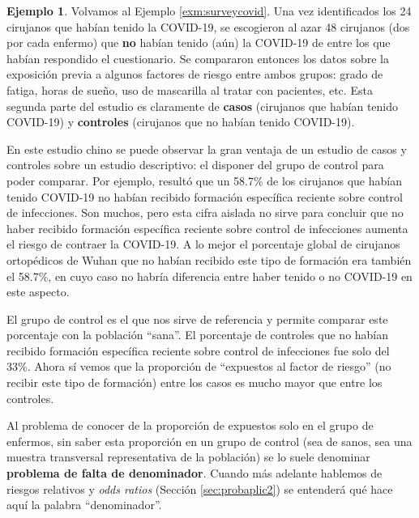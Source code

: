 \documentclass[
]{book}
\theoremstyle{definition}
\theoremstyle{definition}
\newtheorem{example}{Ejemplo}[chapter]
\theoremstyle{definition}
\theoremstyle{definition}
\theoremstyle{remark}
\begin{document}
\begin{example}
\protect\hypertarget{exm:surveycovid2}{}\label{exm:surveycovid2}Volvamos al Ejemplo \ref{exm:surveycovid}. Una vez identificados los 24 cirujanos que habían tenido la COVID-19, se escogieron al azar 48 cirujanos (dos por cada enfermo) que \textbf{no} habían tenido (aún) la COVID-19 de entre los que habían respondido el cuestionario. Se compararon entonces los datos sobre la exposición previa a algunos factores de riesgo entre ambos grupos: grado de fatiga, horas de sueño, uso de mascarilla al tratar con pacientes, etc. Esta segunda parte del estudio es claramente de \textbf{casos} (cirujanos que habían tenido COVID-19) y \textbf{controles} (cirujanos que no habían tenido COVID-19).
\end{example}

En este estudio chino se puede observar la gran ventaja de un estudio de casos y controles sobre un estudio descriptivo: el disponer del grupo de control para poder comparar. Por ejemplo, resultó que un 58.7\% de los cirujanos que habían tenido COVID-19 no habían recibido formación específica reciente sobre control de infecciones. Son muchos, pero esta cifra aislada no sirve para concluir que no haber recibido formación específica reciente sobre control de infecciones aumenta el riesgo de contraer la COVID-19. A lo mejor el porcentaje global de cirujanos ortopédicos de Wuhan que no habían recibido este tipo de formación era también el 58.7\%, en cuyo caso no habría diferencia entre haber tenido o no COVID-19 en este aspecto.

El grupo de control es el que nos sirve de referencia y permite comparar este porcentaje con la población ``sana''. El porcentaje de controles que no habían recibido formación específica reciente sobre control de infecciones fue solo del 33\%. Ahora sí vemos que la proporción de ``expuestos al factor de riesgo'' (no recibir este tipo de formación) entre los casos es mucho mayor que entre los controles.

\begin{rmdnote}
Al problema de conocer de la proporción de expuestos solo en el grupo de enfermos, sin saber esta proporción en un grupo de control (sea de sanos, sea una muestra transversal representativa de la población) se lo suele denominar \textbf{problema de falta de denominador}. Cuando más adelante hablemos de riesgos relativos y \emph{odds ratios} (Sección \ref{sec:probaplic2}) se entenderá qué hace aquí la palabra ``denominador''.
\end{rmdnote}
\end{document}
